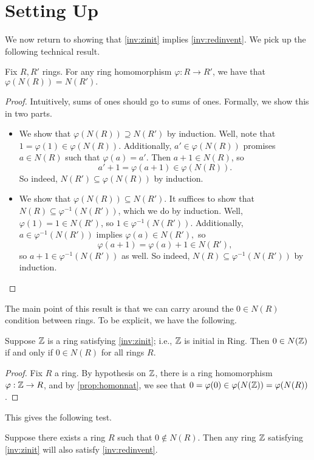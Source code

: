 \documentclass{article}
\begin{document}
\section{Setting Up}
We now return to showing that \autoref{inv:zinit} implies \autoref{inv:redinvent}. We pick up the following technical result.
\begin{proposition} \label{prop:homonnat}
	Fix $R,R'$ rings. For any ring homomorphism $\varphi:R\to R'$, we have that $\varphi(N(R))=N(R').$
\end{proposition}
\begin{proof}
	Intuitively, sums of ones should go to sums of ones. Formally, we show this in two parts.
	\begin{itemize}
		\item We show that $\varphi(N(R))\supseteq N(R')$ by induction. Well, note that $1=\varphi(1)\in\varphi(N(R))$. Additionally, $a'\in\varphi(N(R))$ promises $a\in N(R)$ such that $\varphi(a)=a'$. Then $a+1\in N(R)$, so
		\[a'+1=\varphi(a+1)\in\varphi(N(R)).\]
		So indeed, $N(R')\subseteq\varphi(N(R))$ by induction.
		\item We show that $\varphi(N(R))\subseteq N(R')$. It suffices to show that $N(R)\subseteq\varphi^{-1}(N(R'))$, which we do by induction. Well, $\varphi(1)=1\in N(R')$, so $1\in\varphi^{-1}(N(R'))$. Additionally, $a\in\varphi^{-1}(N(R'))$ implies $\varphi(a)\in N(R'),$ so
		\[\varphi(a+1)=\varphi(a)+1\in N(R'),\]
		so $a+1\in\varphi^{-1}(N(R'))$ as well. So indeed, $N(R)\subseteq\varphi^{-1}(N(R'))$ by induction.
		\qedhere
	\end{itemize}
\end{proof}
The main point of this result is that we can carry around the $0\in N(R)$ condition between rings. To be explicit, we have the following.
\begin{corollary} \label{cor:carryzero}
	Suppose $\mathbb Z$ is a ring satisfying \autoref{inv:zinit}; i.e., $\mathbb Z$ is initial in $\mathrm{Ring}$. Then $0\in N(\mathbb Z)$ if and only if $0\in N(R)$ for all rings $R$.
\end{corollary}
\begin{proof}
	Fix $R$ a ring. By hypothesis on $\mathbb Z$, there is a ring homomorphism $\varphi:\mathbb Z\to R$, and by \autoref{prop:homonnat}, we see that $0=\varphi(0)\in\varphi(N(\mathbb Z))=\varphi(N(R))$.
\end{proof}
This gives the following test.
\begin{proposition} \label{prop:thetest}
	Suppose there exists a ring $R$ such that $0\notin N(R)$. Then any ring $\mathbb Z$ satisfying \autoref{inv:zinit} will also satisfy \autoref{inv:redinvent}.
\end{proposition}
\end{document}
